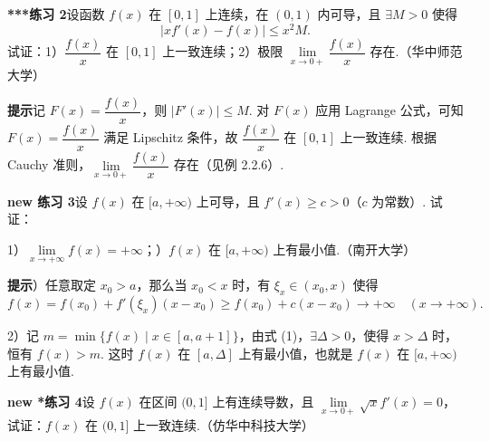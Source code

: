 \documentclass[UTF8, 12pt, fontset=fandol, oneside]{ctexart}
\begin{document}
\noindent\textbf{***练习 2}\quad 设函数 $f(x)$ 在 $[0,1]$ 上连续，在 $(0,1)$ 内可导，且 $\exists M>0$ 使得
\begin{equation}
  |xf'(x)-f(x)|\le x^2M.
\tag{1}
\end{equation}
试证：1）$\dfrac{f(x)}x$ 在 $[0,1]$ 上一致连续；2）极限 $\lim\limits_{x\to0+}\dfrac{f(x)}x$ 存在.（华中师范大学）

\noindent\textbf{提示}\quad 记 $F(x)=\dfrac{f(x)}x$，则 $|F'(x)|\le M$. 对 $F(x)$ 应用 Lagrange 公式，可知 $F(x)=\dfrac{f(x)}x$ 满足 Lipschitz 条件，故 $\dfrac{f(x)}x$ 在 $[0,1]$ 上一致连续. 根据 Cauchy 准则，$\lim\limits_{x\to0+}\dfrac{f(x)}x$ 存在（见例 2.2.6）.

\noindent\textbf{new 练习 3}\quad 设 $f(x)$ 在 $[a,+\infty)$ 上可导，且 $f'(x)\ge c>0$（$c$ 为常数）. 试证：

1）$\lim\limits_{x\to+\infty}f(x)=+\infty$；）$f(x)$ 在 $[a,+\infty)$ 上有最小值.（南开大学）

\noindent\textbf{提示}）任意取定 $x_0>a$，那么当 $x_0<x$ 时，有 $\xi_x\in(x_0,x)$ 使得
\begin{equation}
  f(x)=f(x_0)+f'(\xi_x)(x-x_0)\ge f(x_0)+c(x-x_0)\to+\infty\quad(x\to+\infty).
\tag{1}
\end{equation}

2）记 $m=\min\{f(x)\mid x\in[a,a+1]\}$，由式 (1)，$\exists\Delta>0$，使得 $x>\Delta$ 时，恒有 $f(x)>m$. 这时 $f(x)$ 在 $[a,\Delta]$ 上有最小值，也就是 $f(x)$ 在 $[a,+\infty)$ 上有最小值.

\noindent\textbf{new *练习 4}\quad 设 $f(x)$ 在区间 $(0,1]$ 上有连续导数，且 $\lim\limits_{x\to0+}\sqrt{x}f'(x)=0$，试证：$f(x)$ 在 $(0,1]$ 上一致连续.（仿华中科技大学）
\end{document}
